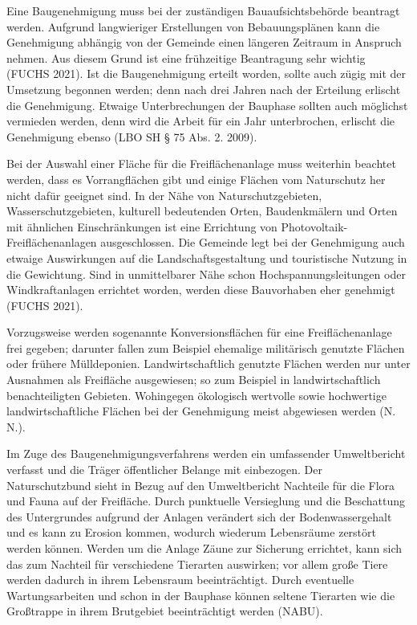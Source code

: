 \documentclass[11pt]{scrartcl}
\begin{document}
Eine Baugenehmigung muss bei der zuständigen Bauaufsichtsbehörde beantragt werden.
Aufgrund langwieriger Erstellungen von Bebauungsplänen kann die Genehmigung abhängig von der Gemeinde einen längeren Zeitraum in Anspruch nehmen.
Aus diesem Grund ist eine frühzeitige Beantragung sehr wichtig (FUCHS 2021).
Ist die Baugenehmigung erteilt worden, sollte auch zügig mit der Umsetzung begonnen werden; denn nach drei Jahren nach der Erteilung erlischt die Genehmigung.
Etwaige Unterbrechungen der Bauphase sollten auch möglichst vermieden werden, denn wird die Arbeit für ein Jahr unterbrochen, erlischt die Genehmigung ebenso (LBO SH § 75 Abs. 2. 2009).

Bei der Auswahl einer Fläche für die Freiflächenanlage muss weiterhin beachtet werden, dass es Vorrangflächen gibt und einige Flächen vom Naturschutz her nicht dafür geeignet sind.
In der Nähe von Naturschutzgebieten, Wasserschutzgebieten, kulturell bedeutenden Orten, Baudenkmälern und Orten mit ähnlichen Einschränkungen ist eine Errichtung von Photovoltaik-Freiflächenanlagen ausgeschlossen.
Die Gemeinde legt bei der Genehmigung auch etwaige Auswirkungen auf die Landschaftsgestaltung und touristische Nutzung in die Gewichtung.
Sind in unmittelbarer Nähe schon Hochspannungsleitungen oder Windkraftanlagen errichtet worden, werden diese Bauvorhaben eher genehmigt (FUCHS 2021).

Vorzugsweise werden sogenannte Konversionsflächen für eine Freiflächenanlage frei gegeben; darunter fallen zum Beispiel ehemalige militärisch genutzte Flächen oder frühere Mülldeponien.
Landwirtschaftlich genutzte Flächen werden nur unter Ausnahmen als Freifläche ausgewiesen; so zum Beispiel in landwirtschaftlich benachteiligten Gebieten.
Wohingegen ökologisch wertvolle sowie hochwertige landwirtschaftliche Flächen bei der Genehmigung meist abgewiesen werden (N. N.).
 
Im Zuge des Baugenehmigungsverfahrens werden ein umfassender Umweltbericht verfasst und die Träger öffentlicher Belange mit einbezogen.
Der Naturschutzbund sieht in Bezug auf den Umweltbericht Nachteile für die Flora und Fauna auf der Freifläche.
Durch punktuelle Versieglung und die Beschattung des Untergrundes aufgrund der Anlagen verändert sich der Bodenwassergehalt und es kann zu Erosion kommen, wodurch wiederum Lebensräume zerstört werden können.
Werden um die Anlage Zäune zur Sicherung errichtet, kann sich das zum Nachteil für verschiedene Tierarten auswirken; vor allem große Tiere werden dadurch in ihrem Lebensraum beeinträchtigt.
Durch eventuelle Wartungsarbeiten und schon in der Bauphase können seltene Tierarten wie die Großtrappe in ihrem Brutgebiet beeinträchtigt werden (NABU).
 
\end{document}
